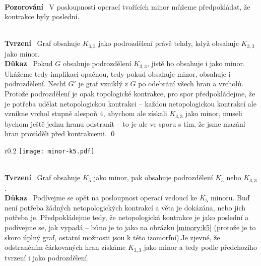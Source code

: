 \documentclass{article}
\renewcommand{\paragraph}[1]{\ \\\smallskip\noindent\textbf{#1}\ }
\begin{document}
\paragraph{Pozorování} V posloupnosti operací tvořících minor můžeme 
předpokládat, že kontrakce byly poslední.

\paragraph{Tvrzení} Graf obsahuje $K_{3,3}$ jako podrozdělení právě tehdy, když 
obsahuje $K_{3,3}$ jako minor.
\paragraph{Důkaz}
Pokud $G$ obsahuje podrozdělení $K_{3,3}$, jistě ho obsahuje i jako minor.  
Ukážeme tedy implikaci opačnou, tedy pokud obsahuje minor, obsahuje i 
podrozdělení. Nechť $G'$ je graf vzniklý z $G$ po odebrání všech hran a vrcholů.  
Protože podrozdělení je opak topologické kontrakce, pro spor předpokládejme, že 
je potřeba udělat netopologickou kontrakci -- každou netopologickou kontrakcí 
ale vznikne vrchol stupně alespoň 4, abychom ale získali $K_{3,3}$ jako minor, 
museli bychom ještě jednu hranu odstranit -- to je ale ve sporu s tím, že jsme 
mazání hran prováděli před kontrakcemi. \qed

\begin{wrapfigure}{r}{0.2\textwidth}
\centering
\texttt{[image: minor-k5.pdf]}
\caption{Minor $K_5$ před poslední kontrakcí}
\label{minory:k5}
\end{wrapfigure}
\paragraph{Tvrzení} Graf obsahuje $K_5$ jako minor, pak obsahuje podrozdělení 
$K_5$ nebo $K_{3,3}$.
\paragraph{Důkaz}
Podívejme se opět na posloupnost operací vedoucí ke $K_5$ minoru. Buď není 
potřeba žádných netopologických kontrakcí a věta je dokázána, nebo jich potřeba 
je. Předpokládejme tedy, že netopologická kontrakce je jako poslední a podívejme 
se, jak vypadá -- bůno je to jako na obrázku \ref{minory:k5} (protože je to 
skoro úplný graf, ostatní možnosti jsou k této izomorfní).Je zjevné, že 
odstraněním čárkovaných hran získáme $K_{3,3}$ jako minor a tedy podle 
předchozího tvrzení i jako podrozdělení.
\end{document}
